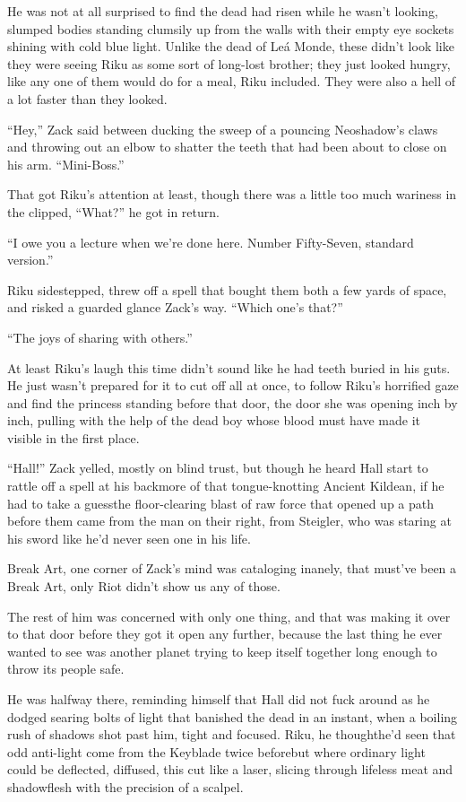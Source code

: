 He was not at all surprised to find the dead had risen while he wasn't looking, slumped bodies standing clumsily up from the walls with their empty eye sockets shining with cold blue light. Unlike the dead of Leá Monde, these didn't look like they were seeing Riku as some sort of long-lost brother; they just looked hungry, like any one of them would do for a meal, Riku included. They were also a hell of a lot faster than they looked.

``Hey,'' Zack said between ducking the sweep of a pouncing Neoshadow's claws and throwing out an elbow to shatter the teeth that had been about to close on his arm. ``Mini-Boss.''

That got Riku's attention at least, though there was a little too much wariness in the clipped, ``What?'' he got in return.

``I owe you a lecture when we're done here. Number Fifty-Seven, standard version.''

Riku sidestepped, threw off a spell that bought them both a few yards of space, and risked a guarded glance Zack's way. ``Which one's that?''

``The joys of sharing with others.''

At least Riku's laugh this time didn't sound like he had teeth buried in his guts. He just wasn't prepared for it to cut off all at once, to follow Riku's horrified gaze and find the princess standing before that door, the door she was opening inch by inch, pulling with the help of the dead boy whose blood must have made it visible in the first place.

``Hall!'' Zack yelled, mostly on blind trust, but though he heard Hall start to rattle off a spell at his back\textemdash more of that tongue-knotting Ancient Kildean, if he had to take a guess\textemdash the floor-clearing blast of raw force that opened up a path before them came from the man on their right, from Steigler, who was staring at his sword like he'd never seen one in his life.

Break Art, one corner of Zack's mind was cataloging inanely, that must've been a Break Art, only Riot didn't show us any of those.

The rest of him was concerned with only one thing, and that was making it over to that door before they got it open any further, because the last thing he ever wanted to see was another planet trying to keep itself together long enough to throw its people safe.

He was halfway there, reminding himself that Hall did not fuck around as he dodged searing bolts of light that banished the dead in an instant, when a boiling rush of shadows shot past him, tight and focused. Riku, he thought\textemdash he'd seen that odd anti-light come from the Keyblade twice before\textemdash but where ordinary light could be deflected, diffused, this cut like a laser, slicing through lifeless meat and shadowflesh with the precision of a scalpel.

